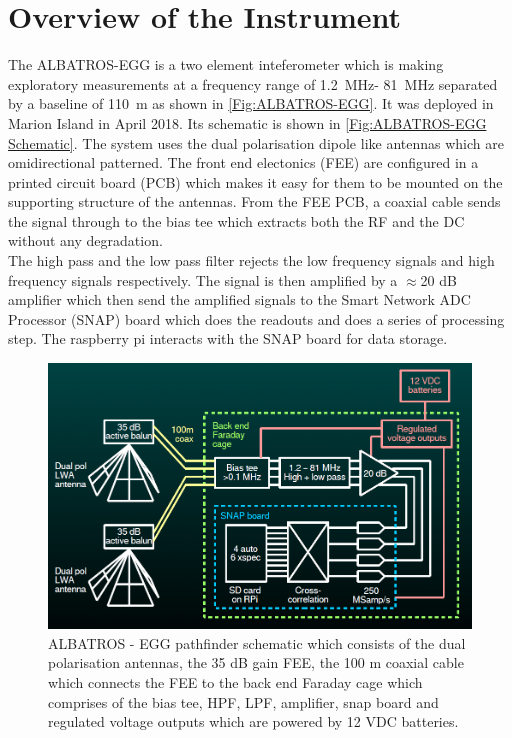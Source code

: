 \documentclass{ws-jai}
\begin{document}
\section{Overview of the Instrument}

The ALBATROS-EGG is a two element inteferometer which is making exploratory measurements at a frequency range of \SI{1.2}{MHz}- \SI{81}{MHz} separated by a baseline of \SI{110}{m} as shown in \autoref{Fig:ALBATROS-EGG}. It was deployed in Marion Island in April 2018. Its schematic is shown in \autoref{Fig:ALBATROS-EGG Schematic}. The system uses the dual polarisation dipole like antennas which are omidirectional patterned. The front end electonics (FEE) are configured in a printed circuit board (PCB) which makes it easy for them to be mounted on the supporting structure of the antennas. From the FEE PCB, a coaxial cable sends the signal through to the bias tee which extracts both the RF and the DC without any degradation. \\

The high pass and the low pass filter rejects the low frequency signals and high frequency signals respectively. The signal is then amplified by a $\approx$20 dB amplifier which then send the amplified signals to the Smart Network ADC Processor (SNAP) board which does the readouts and does a series of processing step. The raspberry pi interacts with the SNAP board for data storage.\\


\begin{figure}[h!]
	\begin{center}
		\includegraphics[width=0.55\linewidth]{Figures/ALBATROS-EGG-Schematic.PNG}
		\caption{ALBATROS - EGG pathfinder schematic which consists of the dual polarisation antennas, the 35 dB gain FEE, the 100 m coaxial cable which connects the FEE to the back end Faraday cage which comprises of the bias tee, HPF, LPF, amplifier, snap board and regulated voltage outputs which are powered by 12 VDC batteries.}
		\label{Fig:ALBATROS-EGG Schematic}
	\end{center}
\end{figure}
\end{document}
